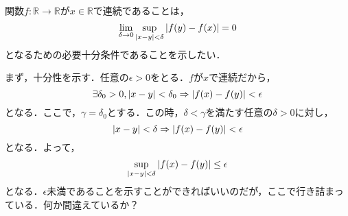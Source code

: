 \documentclass[12pt]{jarticle}
\numberwithin{equation}{section}    %
\numberwithin{figure}{section}      %
\numberwithin{table}{section}      %
\begin{document}
関数$f: \mathbb{R} \to \mathbb{R}$が$x \in \mathbb{R}$で連続であることは，
\begin{equation}
    \lim_{\delta \to 0} \sup_{\left|x - y\right| < \delta} \left|f(y) - f(x)\right| = 0
\end{equation}
となるための必要十分条件であることを示したい．

まず，十分性を示す．任意の$\epsilon > 0$をとる．$f$が$x$で連続だから，
\begin{equation}
    \exists \delta_{0} > 0, \left|x - y\right| < \delta_{0} \Rightarrow \left|f(x) - f(y)\right| < \epsilon
\end{equation}
となる．ここで，$\gamma = \delta_{0}$とする．この時，$\delta < \gamma$を満たす任意の$\delta > 0$に対し，
\begin{equation}
    \left|x - y\right| < \delta \Rightarrow \left|f(x) - f(y)\right| < \epsilon
\end{equation}
となる．よって，
\begin{equation}
    \sup_{\left|x - y\right| < \delta} \left|f(x) - f(y)\right| \le \epsilon
\end{equation}
となる．$\epsilon$未満であることを示すことができればいいのだが，ここで行き詰まっている．何か間違えているか？
\end{document}

